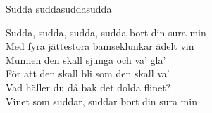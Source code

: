 \begin{song}{Sudda sudda}{suddasudda}
\begin{vers}
Sudda, sudda, sudda, sudda bort din sura min\\
Med fyra jättestora bamseklunkar ädelt vin\\
Munnen den skall sjunga och va' gla'\\
För att den skall bli som den skall va'\\
Vad häller du då bak det dolda flinet?\\
Vinet som suddar, suddar bort din sura min\\
\end{vers}
\end{song}
